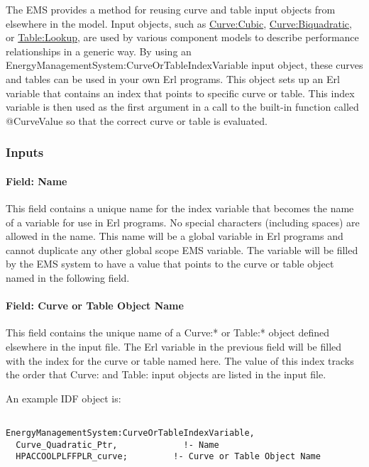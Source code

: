The EMS provides a method for reusing curve and table input objects from elsewhere in the model. Input objects, such as \hyperref[curvecubic]{Curve:Cubic}, \hyperref[curvebiquadratic]{Curve:Biquadratic}, or \hyperref[tablelookup]{Table:Lookup}, are used by various component models to describe performance relationships in a generic way. By using an EnergyManagementSystem:CurveOrTableIndexVariable input object, these curves and tables can be used in your own Erl programs. This object sets up an Erl variable that contains an index that points to specific curve or table. This index variable is then used as the first argument in a call to the built-in function called @CurveValue so that the correct curve or table is evaluated.

\subsubsection{Inputs}\label{inputs-9-005}

\paragraph{Field: Name}\label{field-name-9-005}

This field contains a unique name for the index variable that becomes the name of a variable for use in Erl programs. No special characters (including spaces) are allowed in the name. This name will be a global variable in Erl programs and cannot duplicate any other global scope EMS variable. The variable will be filled by the EMS system to have a value that points to the curve or table object named in the following field.

\paragraph{Field: Curve or Table Object Name}\label{field-curve-or-table-object-name}

This field contains the unique name of a Curve:* or Table:* object defined elsewhere in the input file. The Erl variable in the previous field will be filled with the index for the curve or table named here. The value of this index tracks the order that Curve: and Table: input objects are listed in the input file.

An example IDF object is:

\begin{lstlisting}

EnergyManagementSystem:CurveOrTableIndexVariable,
  Curve_Quadratic_Ptr,             !- Name
  HPACCOOLPLFFPLR_curve;         !- Curve or Table Object Name
\end{lstlisting}

